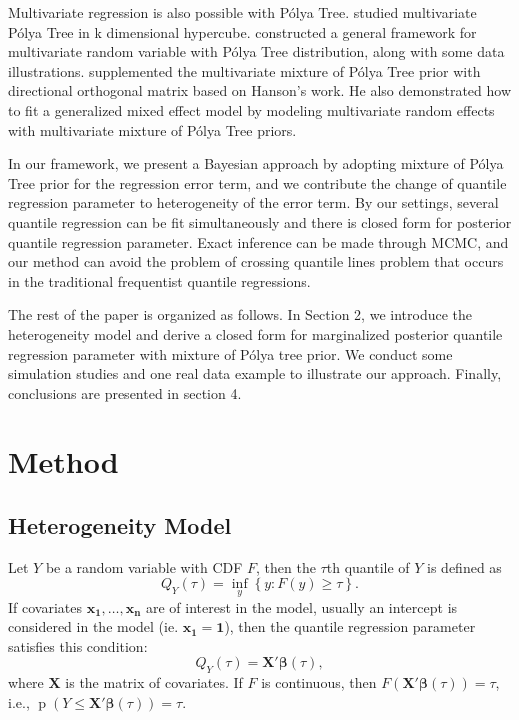 \documentclass[12pt]{article}
\newcommand{\polya}{P\'{o}lya}
\DeclareMathOperator{\pr}{p}
\begin{document}
Multivariate regression is also possible with \polya{}
Tree. \citet{paddock1999, paddock2002}
studied multivariate \polya{} Tree in k dimensional
hypercube. \citet{hanson2006} 
constructed a general framework for multivariate random 
variable with \polya{} Tree distribution, along with some data
illustrations. \citet{jara2009} supplemented the multivariate
mixture of \polya{} Tree prior with directional orthogonal matrix based
on Hanson's work. He also demonstrated how to fit a
generalized mixed effect model by modeling multivariate random effects
with multivariate mixture of \polya{} Tree priors. 

In our framework, we present a Bayesian approach by adopting mixture
of \polya{} Tree prior for the regression error term, and we contribute
the change of quantile regression parameter to heterogeneity of the
error term. By our settings, several quantile regression can be fit
simultaneously and there is closed form for  posterior quantile
regression parameter. Exact inference can be made through MCMC, and
our method can avoid the problem of 
crossing quantile lines problem that occurs in the
traditional frequentist quantile regressions. 

The rest of the paper is organized as follows. In Section 2, we
introduce the heterogeneity model and derive a closed form for
marginalized posterior quantile regression parameter with mixture of
\polya{} tree prior. We conduct some simulation studies and one real
data example to illustrate our approach. Finally, conclusions are
presented in section 4. 

\section{Method}
\subsection{Heterogeneity Model}
Let $Y$ be a random variable with CDF $F$, then the $\tau$th quantile
of $Y$ is defined as 
\begin{displaymath}
  Q_Y(\tau) = \underset{y}{\inf} \left\{ y: F(y) \ge \tau \right\}.
\end{displaymath}
If covariates $\bm{x_1, \ldots, x_n}$ are of interest in the model,
usually an intercept is considered in the model (ie. $\bm{x_1}=
\bm{1}$), then the quantile regression parameter satisfies this
condition: 
\begin{displaymath}
  Q_Y(\tau) = \bm{X'\beta}(\tau),
\end{displaymath}
where $\bm{X}$ is the matrix of covariates. If $F$ is continuous, then
$F(\bm{X'\beta}(\tau)) = \tau$, i.e., $\pr(Y \le \bm{X'\beta}(\tau)) =
\tau$. 
\end{document}
